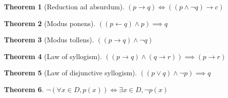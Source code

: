 \documentclass[11pt]{article}
\theoremstyle{definition}
\newtheorem{theorem}{Theorem}[section]
\begin{document}
\begin{theorem}[Reduction ad absurdum]
    $(p \rightarrow q) \iff ((p \land \lnot q) \rightarrow c)$
\end{theorem}
\begin{theorem}[Modus ponens]
    $((p \leftarrow q) \land p) \implies q$
\end{theorem}
\begin{theorem}[Modus tollens]
    $((p \rightarrow q) \land \lnot q) $
\end{theorem}
\begin{theorem}[Law of syllogism]
    $((p \rightarrow q)\land(q \rightarrow r)) \implies (p \rightarrow r)$
\end{theorem}
\begin{theorem}[Law of disjunctive syllogism]
    $((p \lor q) \land \lnot p) \implies q$
\end{theorem}
\begin{theorem}
    $\lnot(\forall x \in D, p(x)) \iff \exists x \in D, \lnot p(x)$
\end{theorem}
\end{document}
